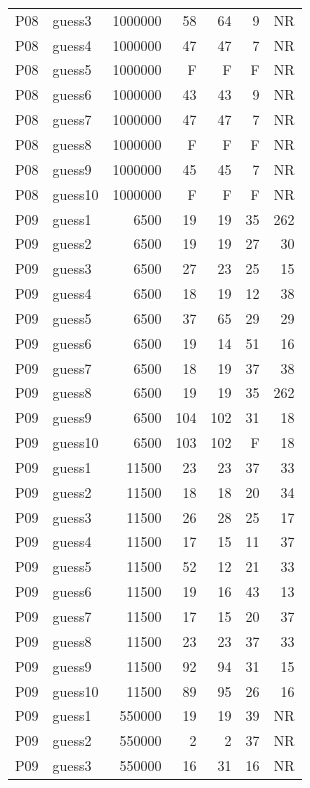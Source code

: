 {\begin{longtable}{llrrrrr}
P08 & guess3 & 1000000 & 58 & 64 & 9 & NR \\
P08 & guess4 & 1000000 & 47 & 47 & 7 & NR \\
P08 & guess5 & 1000000 & F & F & F & NR \\
P08 & guess6 & 1000000 & 43 & 43 & 9 & NR \\
P08 & guess7 & 1000000 & 47 & 47 & 7 & NR \\
P08 & guess8 & 1000000 & F & F & F & NR \\
P08 & guess9 & 1000000 & 45 & 45 & 7 & NR \\
P08 & guess10 & 1000000 & F & F & F & NR \\
P09 & guess1 & 6500 & 19 & 19 & 35 & 262 \\
P09 & guess2 & 6500 & 19 & 19 & 27 & 30 \\
P09 & guess3 & 6500 & 27 & 23 & 25 & 15 \\
P09 & guess4 & 6500 & 18 & 19 & 12 & 38 \\
P09 & guess5 & 6500 & 37 & 65 & 29 & 29 \\
P09 & guess6 & 6500 & 19 & 14 & 51 & 16 \\
P09 & guess7 & 6500 & 18 & 19 & 37 & 38 \\
P09 & guess8 & 6500 & 19 & 19 & 35 & 262 \\
P09 & guess9 & 6500 & 104 & 102 & 31 & 18 \\
P09 & guess10 & 6500 & 103 & 102 & F & 18 \\
P09 & guess1 & 11500 & 23 & 23 & 37 & 33 \\
P09 & guess2 & 11500 & 18 & 18 & 20 & 34 \\
P09 & guess3 & 11500 & 26 & 28 & 25 & 17 \\
P09 & guess4 & 11500 & 17 & 15 & 11 & 37 \\
P09 & guess5 & 11500 & 52 & 12 & 21 & 33 \\
P09 & guess6 & 11500 & 19 & 16 & 43 & 13 \\
P09 & guess7 & 11500 & 17 & 15 & 20 & 37 \\
P09 & guess8 & 11500 & 23 & 23 & 37 & 33 \\
P09 & guess9 & 11500 & 92 & 94 & 31 & 15 \\
P09 & guess10 & 11500 & 89 & 95 & 26 & 16 \\
P09 & guess1 & 550000 & 19 & 19 & 39 & NR \\
P09 & guess2 & 550000 & 2 & 2 & 37 & NR \\
P09 & guess3 & 550000 & 16 & 31 & 16 & NR \\

\end{longtable}}
